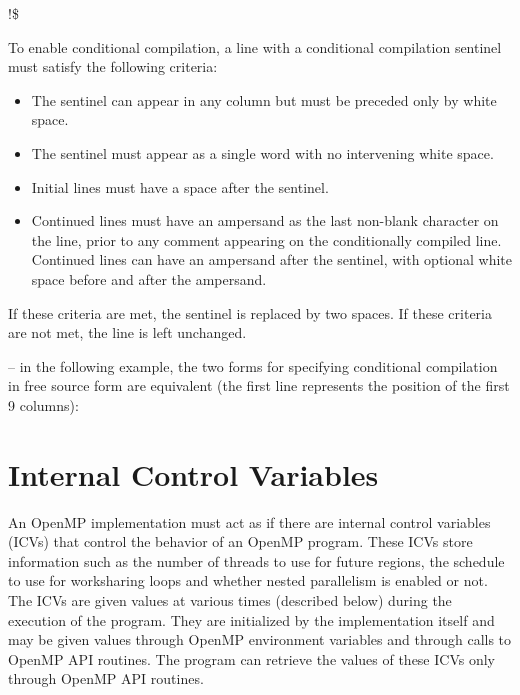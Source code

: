 \begin{boxedcode}
!\$
\end{boxedcode}

To enable conditional compilation, a line with a conditional compilation sentinel must 
satisfy the following criteria: 

\begin{itemize}
\item The sentinel can appear in any column but must be preceded only by white space.

\item The sentinel must appear as a single word with no intervening white space. 

\item Initial lines must have a space after the sentinel. 

\item Continued lines must have an ampersand as the last non-blank character on the line, 
prior to any comment appearing on the conditionally compiled line. Continued lines 
can have an ampersand after the sentinel, with optional white space before and after 
the ampersand. 
\end{itemize}

If these criteria are met, the sentinel is replaced by two spaces. If these criteria are not 
met, the line is left unchanged. 

\notestart
\noteheader – in the following example, the two forms for specifying conditional compilation 
in free source form are equivalent (the first line represents the position of the first 9 
columns):

\begin{alltt}
\end{alltt}
\noteend
\bigskip
\fortranspecificend









\section{ Internal Control Variables}
\label{sec:Internal Control Variables}
An OpenMP implementation must act as if there are internal control variables (ICVs) 
that control the behavior of an OpenMP program. These ICVs store information such as 
the number of threads to use for future  regions, the schedule to use for 
worksharing loops and whether nested parallelism is enabled or not. The ICVs are given 
values at various times (described below) during the execution of the program. They are 
initialized by the implementation itself and may be given values through OpenMP 
environment variables and through calls to OpenMP API routines. The program can 
retrieve the values of these ICVs only through OpenMP API routines.

